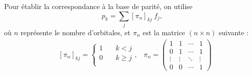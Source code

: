 \documentclass[12pt,a4paper,svgnames,x11names,rgb,table]{article} %
\numberwithin{equation}{section} %
\numberwithin{figure}{section} %
\numberwithin{table}{section} %
\begin{document}
Pour établir la correspondance à la base de parité, on utilise 
\begin{equation}
     p_k = \sum_j [ \pi_n]_{kj}\ f_j,
\end{equation}
où $n$ représente le nombre d'orbitales, et $\pi_n$ est la matrice $(n\times n)$ suivante : 
\begin{align}
 & [\pi_n]_{kj} =  
  \begin{cases}
    1 & \quad k < j \\
    0 & \quad k \geq j\\
  \end{cases} ,
  &  \pi_n = 
 \begin{pmatrix}
  1 & 1 & \cdots & 1 \\
  0 & 1 & \cdots & 1 \\
  \vdots  & \vdots  & \ddots & \vdots  \\
  0 & 0 & \cdots & 1
 \end{pmatrix}
\end{align}  
\end{document}
